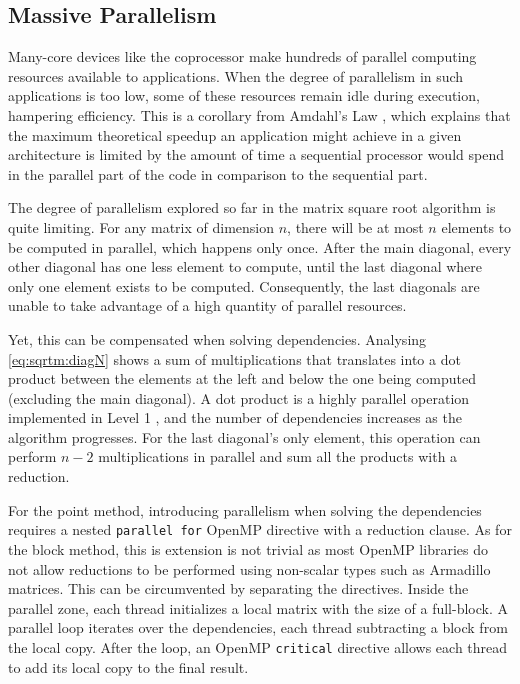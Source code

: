 \documentclass[../thesis]{subfiles}
\begin{document}
		\subsection{Massive Parallelism}
		Many-core devices like the \intel\xeonphi coprocessor make hundreds of parallel computing resources available to applications. When the degree of parallelism in such applications is too low, some of these resources remain idle during execution, hampering efficiency. This is a corollary from Amdahl's Law \cite{Amdahl:1967}, which explains that the maximum theoretical speedup an application might achieve in a given architecture is limited by the amount of time a sequential processor would spend in the parallel part of the code in comparison to the sequential part.

		The degree of parallelism explored so far in the matrix square root algorithm is quite limiting. For any matrix of dimension $n$, there will be at most $n$ elements to be computed in parallel, which happens only once. After the main diagonal, every other diagonal has one less element to compute, until the last diagonal where only one element exists to be computed. Consequently, the last diagonals are unable to take advantage of a high quantity of parallel resources.

		Yet, this can be compensated when solving dependencies. Analysing \cref{eq:sqrtm:diagN} shows a sum of multiplications that translates into a dot product between the elements at the left and below the one being computed (excluding the main diagonal). A dot product is a highly parallel operation implemented in Level 1 \blas, and the number of dependencies increases as the algorithm progresses. For the last diagonal's only element, this operation can perform $n-2$ multiplications in parallel and sum all the products with a reduction.

		For the point method, introducing parallelism when solving the dependencies requires a nested \texttt{parallel for} OpenMP directive with a reduction clause. As for the block method, this is extension is not trivial as most OpenMP libraries do not allow reductions to be performed using non-scalar types such as Armadillo matrices. This can be circumvented by separating the directives. Inside the parallel zone, each thread initializes a local matrix with the size of a full-block. A parallel loop iterates over the dependencies, each thread subtracting a block from the local copy. After the loop, an OpenMP \texttt{critical} directive allows each thread to add its local copy to the final result.
\end{document}
